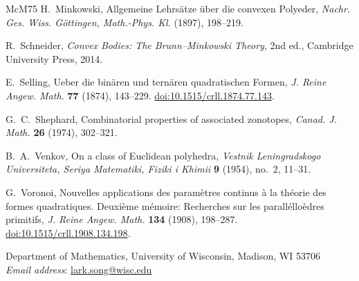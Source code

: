 \documentclass[11pt]{article}
\theoremstyle{remark}
\begin{document}
\begin{thebibliography}{McM75}
H.~Minkowski,
Allgemeine Lehrs\"atze \"uber die convexen Polyeder,
\emph{Nachr. Ges. Wiss. G\"ottingen, Math.-Phys. Kl.} (1897), 198--219.

R.~Schneider,
\emph{Convex Bodies: The Brunn--Minkowski Theory}, 2nd ed.,
Cambridge University Press, 2014.

E.~Selling,
Ueber die bin\"aren und tern\"aren quadratischen Formen,
\emph{J. Reine Angew. Math.} \textbf{77} (1874), 143--229.
\href{https://doi.org/10.1515/crll.1874.77.143}{doi:10.1515/crll.1874.77.143}.

G.~C.~Shephard,
Combinatorial properties of associated zonotopes,
\emph{Canad. J. Math.} \textbf{26} (1974), 302--321.

B.~A.~Venkov,
On a class of {Euclidean} polyhedra,
\emph{Vestnik Leningradskogo Universiteta, Seriya Matematiki, Fiziki i Khimii} \textbf{9} (1954), no.~2, 11--31.

G.~Voronoi,
Nouvelles applications des param\`etres continus \`a la th\'eorie des formes quadratiques. Deuxi\`eme m\'emoire: Recherches sur les parall\'ello\`edres primitifs,
\emph{J. Reine Angew. Math.} \textbf{134} (1908), 198--287.
\href{https://doi.org/10.1515/crll.1908.134.198}{doi:10.1515/crll.1908.134.198}.

\end{thebibliography}

\bigskip

\noindent
Department of Mathematics, University of Wisconsin, Madison, WI 53706
\\
\textit{Email address}: \url{lark.song@wisc.edu}
\end{document}

